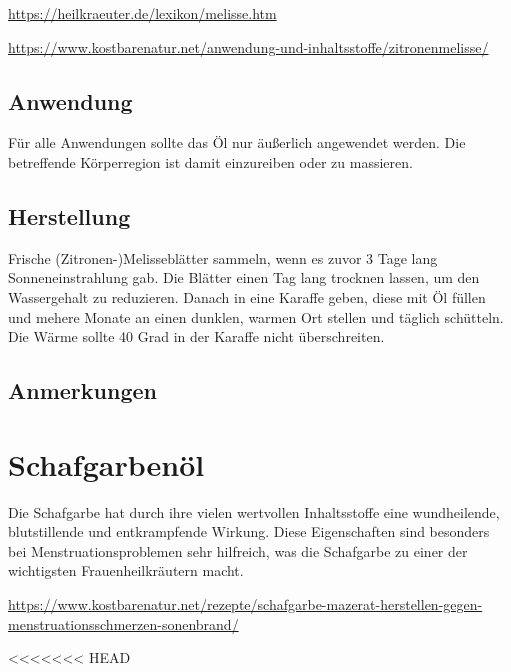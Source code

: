 \cite{heilkraeuterlexikon} 

\url{https://heilkraeuter.de/lexikon/melisse.htm} 

\url{https://www.kostbarenatur.net/anwendung-und-inhaltsstoffe/zitronenmelisse/}

 

\subsection{Anwendung}

Für alle Anwendungen sollte das Öl nur äußerlich angewendet werden. Die betreffende Körperregion ist damit einzureiben oder zu massieren.

\subsection{Herstellung}

Frische (Zitronen-)Melisseblätter sammeln, wenn es zuvor 3 Tage lang Sonneneinstrahlung gab. Die Blätter einen Tag lang trocknen lassen, um den Wassergehalt zu reduzieren. Danach in eine Karaffe geben, diese mit Öl füllen und mehere Monate an einen dunklen, warmen Ort stellen und täglich schütteln. Die Wärme sollte 40 Grad in der Karaffe nicht überschreiten.

\subsection{Anmerkungen}




\newpage



\section{Schafgarbenöl}

Die Schafgarbe hat durch ihre vielen wertvollen Inhaltsstoffe eine wundheilende, blutstillende und entkrampfende Wirkung. Diese Eigenschaften sind besonders bei Menstruationsproblemen sehr hilfreich, was die Schafgarbe zu einer der wichtigsten Frauenheilkräutern macht.

\url{https://www.kostbarenatur.net/rezepte/schafgarbe-mazerat-herstellen-gegen-menstruationsschmerzen-sonenbrand/}

<<<<<<< HEAD
    

